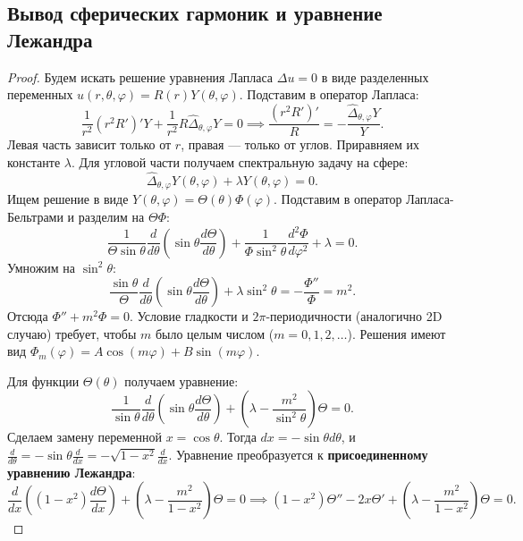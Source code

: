\documentclass[a4paper,10pt]{article}
\begin{document}
\subsection*{Вывод сферических гармоник и уравнение Лежандра}
\begin{proof}
Будем искать решение уравнения Лапласа $\Delta u = 0$ в виде разделенных переменных $u(r, \theta, \varphi) = R(r)Y(\theta, \varphi)$. Подставим в оператор Лапласа:
\[ \frac{1}{r^2}(r^2 R')'Y + \frac{1}{r^2}R \hat{\Delta}_{\theta,\varphi} Y = 0 \implies \frac{(r^2 R')'}{R} = -\frac{\hat{\Delta}_{\theta,\varphi} Y}{Y}. \]
Левая часть зависит только от $r$, правая — только от углов. Приравняем их константе $\lambda$. Для угловой части получаем спектральную задачу на сфере:
\[ \hat{\Delta}_{\theta,\varphi} Y(\theta, \varphi) + \lambda Y(\theta, \varphi) = 0. \]
Ищем решение в виде $Y(\theta, \varphi) = \Theta(\theta)\Phi(\varphi)$. Подставим в оператор Лапласа-Бельтрами и разделим на $\Theta\Phi$:
\[ \frac{1}{\Theta \sin\theta} \frac{d}{d\theta}\left(\sin\theta \frac{d\Theta}{d\theta}\right) + \frac{1}{\Phi \sin^2\theta} \frac{d^2\Phi}{d\varphi^2} + \lambda = 0. \]
Умножим на $\sin^2\theta$:
\[ \frac{\sin\theta}{\Theta} \frac{d}{d\theta}\left(\sin\theta \frac{d\Theta}{d\theta}\right) + \lambda\sin^2\theta = -\frac{\Phi''}{\Phi} = m^2. \]
Отсюда $\Phi'' + m^2\Phi = 0$. Условие гладкости и $2\pi$-периодичности (аналогично 2D случаю) требует, чтобы $m$ было целым числом ($m=0, 1, 2, \dots$). Решения имеют вид $\Phi_m(\varphi) = A\cos(m\varphi) + B\sin(m\varphi)$.

Для функции $\Theta(\theta)$ получаем уравнение:
\[ \frac{1}{\sin\theta} \frac{d}{d\theta}\left(\sin\theta \frac{d\Theta}{d\theta}\right) + \left( \lambda - \frac{m^2}{\sin^2\theta} \right)\Theta = 0. \]
Сделаем замену переменной $x = \cos\theta$. Тогда $dx = -\sin\theta d\theta$, и $\frac{d}{d\theta} = -\sin\theta \frac{d}{dx} = -\sqrt{1-x^2} \frac{d}{dx}$. Уравнение преобразуется к \textbf{присоединенному уравнению Лежандра}:
\[ \frac{d}{dx}\left( (1-x^2) \frac{d\Theta}{dx} \right) + \left( \lambda - \frac{m^2}{1-x^2} \right)\Theta = 0 \implies (1-x^2) \Theta'' - 2x \Theta' + \left( \lambda - \frac{m^2}{1-x^2} \right)\Theta = 0. \]


\end{proof}
\end{document}
